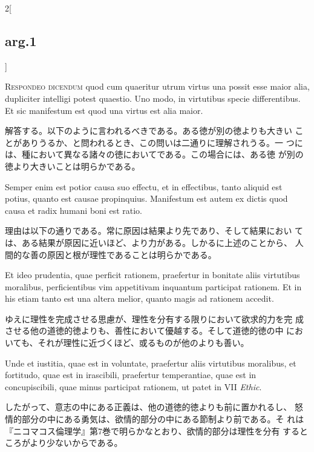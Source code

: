 \documentclass[paper=a4paper,fontsize=10pt,jafontsize=9pt,titlepage]{jlreq}
\begin{document}
\begin{paracol}{2}[\subsection{arg.1}]

{\scshape Respondeo dicendum} quod cum quaeritur utrum virtus una
 possit esse maior alia, dupliciter intelligi potest quaestio. Uno
 modo, in virtutibus specie differentibus. Et sic manifestum est quod
 una virtus est alia maior.

\switchcolumn

解答する。以下のように言われるべきである。ある徳が別の徳よりも大きい
 ことがありうるか、と問われるとき、この問いは二通りに理解されうる。一
 つには、種において異なる諸々の徳においてである。この場合には、ある徳
 が別の徳より大きいことは明らかである。

\switchcolumn*

Semper enim est potior causa suo effectu, et
 in effectibus, tanto aliquid est potius, quanto est causae
 propinquius. Manifestum est autem ex dictis quod causa et radix
 humani boni est ratio.

\switchcolumn

理由は以下の通りである。常に原因は結果より先であり、そして結果におい
 ては、ある結果が原因に近いほど、より力がある。しかるに上述のことから、
 人間的な善の原因と根が理性であることは明らかである。

\switchcolumn*

Et ideo prudentia, quae perficit rationem,
 praefertur in bonitate aliis virtutibus moralibus, perficientibus vim
 appetitivam inquantum participat rationem. Et in his etiam tanto est
 una altera melior, quanto magis ad rationem accedit.

\switchcolumn

ゆえに理性を完成させる思慮が、理性を分有する限りにおいて欲求的力を完
 成させる他の道徳的徳よりも、善性において優越する。そして道徳的徳の中
 においても、それが理性に近づくほど、或るものが他のよりも善い。

\switchcolumn*

Unde et iustitia, quae est in voluntate, praefertur aliis virtutibus
 moralibus, et fortitudo, quae est in irascibili, praefertur
 temperantiae, quae est in concupiscibili, quae minus participat
 rationem, ut patet in VII {\itshape Ethic}.

\switchcolumn

したがって、意志の中にある正義は、他の道徳的徳よりも前に置かれるし、
 怒情的部分の中にある勇気は、欲情的部分の中にある節制より前である。そ
 れは『ニコマコス倫理学』第7巻で明らかなとおり、欲情的部分は理性を分有
 するところがより少ないからである。


\end{paracol}
\end{document}
